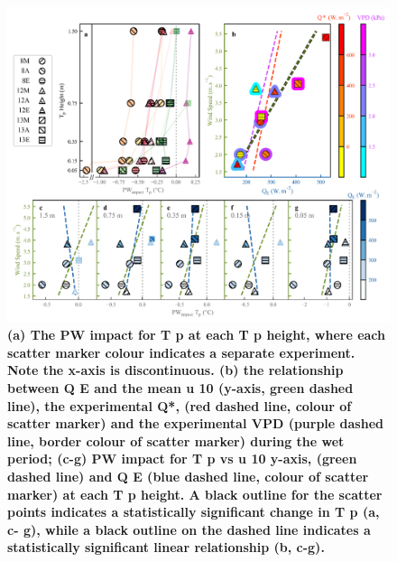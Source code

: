\documentclass[final,3p,times,authoryear]{elsarticle}
\begin{document}
\begin{figure}
\centering
\includegraphics[trim={0 0 0 0},clip,scale=1.0]{pict014.png}
\caption{\bf (a) The PW impact for T p at each T p height, where each scatter marker colour indicates a
separate experiment. Note the x-axis is discontinuous. (b) the relationship between Q E and the mean u 10
(y-axis, green dashed line), the experimental Q*, (red dashed line, colour of scatter marker) and the
experimental VPD (purple dashed line, border colour of scatter marker) during the wet period; (c-g)
PW impact for T p vs u 10 y-axis, (green dashed line) and Q E (blue dashed line, colour of scatter marker) at
each T p height. A black outline for the scatter points indicates a statistically significant change in T p (a, c-
g), while a black outline on the dashed line indicates a statistically significant linear relationship (b, c-g).}
 \label{fig:3.3}
\end{figure}
\end{document}
